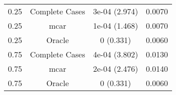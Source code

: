 \begin{table}[ht]
\centering
\begin{tabular}{cccc}
  \hline
  \hline
0.25 & Complete Cases & 3e-04 (2.974) & 0.0070 \\ 
  0.25 & mcar & 1e-04 (1.468) & 0.0070 \\ 
  0.25 & Oracle & 0 (0.331) & 0.0060 \\ 
  0.75 & Complete Cases & 4e-04 (3.802) & 0.0130 \\ 
  0.75 & mcar & 2e-04 (2.476) & 0.0140 \\ 
  0.75 & Oracle & 0 (0.331) & 0.0060 \\ 
   \hline
\end{tabular}
\end{table}
